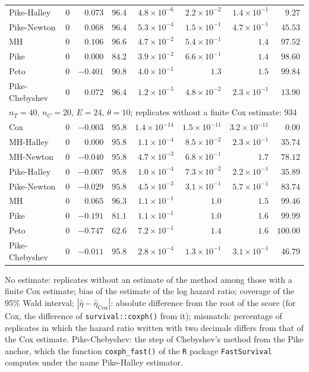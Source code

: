 \begin{landscape}
\begin{longtable}{lrrrrrrr}
Pike-Halley & 0 & $0.073$ & $96.4$ & $4.8 \times 10^{-6}$ & $2.2 \times 10^{-2}$ & $1.4 \times 10^{-1}$ & $9.27$ \\
Pike-Newton & 0 & $0.068$ & $96.4$ & $5.3 \times 10^{-4}$ & $1.5 \times 10^{-1}$ & $4.7 \times 10^{-1}$ & $45.53$ \\
MH & 0 & $0.106$ & $96.6$ & $4.7 \times 10^{-2}$ & $5.4 \times 10^{-1}$ & $1.4$ & $97.52$ \\
Pike & 0 & $0.000$ & $84.2$ & $3.9 \times 10^{-2}$ & $6.6 \times 10^{-1}$ & $1.4$ & $98.60$ \\
Peto & 0 & $-0.401$ & $90.8$ & $4.0 \times 10^{-1}$ & $1.3$ & $1.5$ & $99.84$ \\
Pike-Chebyshev & 0 & $0.072$ & $96.4$ & $1.2 \times 10^{-5}$ & $4.8 \times 10^{-2}$ & $2.3 \times 10^{-1}$ & $13.90$ \\
\multicolumn{8}{l}{$n_T = 40$, $n_C = 20$, $E = 24$, $\theta = 10$; replicates without a finite Cox estimate: 934} \\
Cox & 0 & $-0.003$ & $95.8$ & $1.4 \times 10^{-14}$ & $1.5 \times 10^{-11}$ & $3.2 \times 10^{-11}$ & $0.00$ \\
MH-Halley & 0 & $0.000$ & $95.8$ & $1.1 \times 10^{-4}$ & $8.5 \times 10^{-2}$ & $2.3 \times 10^{-1}$ & $35.74$ \\
MH-Newton & 0 & $-0.040$ & $95.8$ & $4.7 \times 10^{-3}$ & $6.8 \times 10^{-1}$ & $1.7$ & $78.12$ \\
Pike-Halley & 0 & $-0.007$ & $95.8$ & $1.0 \times 10^{-4}$ & $7.3 \times 10^{-2}$ & $2.2 \times 10^{-1}$ & $35.89$ \\
Pike-Newton & 0 & $-0.029$ & $95.8$ & $4.5 \times 10^{-3}$ & $3.1 \times 10^{-1}$ & $5.7 \times 10^{-1}$ & $83.74$ \\
MH & 0 & $0.065$ & $96.3$ & $1.1 \times 10^{-1}$ & $1.0$ & $1.5$ & $99.46$ \\
Pike & 0 & $-0.191$ & $81.1$ & $1.1 \times 10^{-1}$ & $1.0$ & $1.6$ & $99.99$ \\
Peto & 0 & $-0.747$ & $62.6$ & $7.2 \times 10^{-1}$ & $1.4$ & $1.6$ & $100.00$ \\
Pike-Chebyshev & 0 & $-0.011$ & $95.8$ & $2.8 \times 10^{-4}$ & $1.3 \times 10^{-1}$ & $3.1 \times 10^{-1}$ & $46.79$ \\
\end{longtable}
No estimate: replicates without an estimate of the method among those with a finite Cox estimate; bias of the estimate of the log hazard ratio; coverage of the 95\% Wald interval; $|\hat{\eta} - \hat{\eta}_{\mathrm{Cox}}|$: absolute difference from the root of the score (for Cox, the difference of \texttt{survival::coxph()} from it); mismatch: percentage of replicates in which the hazard ratio written with two decimals differs from that of the Cox estimate. Pike-Chebyshev: the step of Chebyshev's method from the Pike anchor, which the function \texttt{coxph\_fast()} of the \texttt{R} package \texttt{FastSurvival} computes under the name Pike-Halley estimator.\par
\endgroup
\end{landscape}
